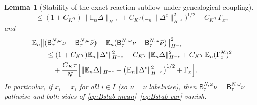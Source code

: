 \documentclass[a4paper,fleqn]{cas-sc}
\newtheorem{lemma}[theorem]{Lemma}
\theoremstyle{definition}
\theoremstyle{remark}
\begin{document}
\begin{lemma}[Stability of the exact reaction subflow under genealogical coupling]
\begin{equation}
\le(1+C_K\tau)\|\mathbb E_n\Delta\|_{H^{-s}}
+C_K\tau\bigl(\mathbb E_n\|\Delta^c\|_{H^{-s}}^2\bigr)^{1/2}
+C_K\tau\,\Gamma_x,
\end{equation}
and
\begin{equation}\label{eq:Bstab-var}
\begin{aligned}
&\mathbb E_n\bigl\|(\mathsf B^{N,\omega}_\tau\nu-\mathsf B^{N,\omega}_\tau\bar\nu)
-\mathbb E_n(\mathsf B^{N,\omega}_\tau\nu-\mathsf B^{N,\omega}_\tau\bar\nu)\bigr\|_{H^{-s}}^2\\
&\qquad\le(1+C_K\tau)\mathbb E_n\|\Delta^c\|_{H^{-s}}^2
+C_K\tau\|\mathbb E_n\Delta\|_{H^{-s}}^2
+C_K\tau\,\mathbb E_n(\Gamma_x^{\mathcal H})^2\\
&\qquad\quad
+\frac{C_K\tau}{N}\Bigl[\|\mathbb E_n\Delta\|_{H^{-s}}
+\bigl(\mathbb E_n\|\Delta^c\|_{H^{-s}}^2\bigr)^{1/2}+\Gamma_x\Bigr].
\end{aligned}
\end{equation}
In particular, if $x_i=\bar x_i$ for all $i\in I$ (so $\nu=\bar\nu$ labelwise),
then $\mathsf B^{N,\omega}_\tau\nu=\mathsf B^{N,\omega}_\tau\bar\nu$ pathwise and
both sides of \eqref{eq:Bstab-mean}--\eqref{eq:Bstab-var} vanish.
\end{lemma}
\end{document}

